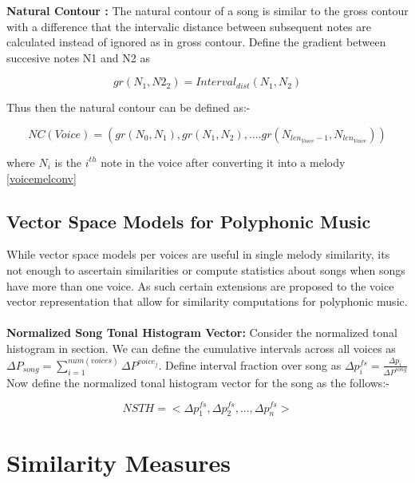 \noindent \textbf{Natural Contour : } The natural contour of a song is similar to the gross contour with a difference that the intervalic distance between subsequent notes are calculated instead of ignored as in gross contour. Define the gradient between succesive notes N1 and N2 as 

\begin{equation}
gr(N_1, N2_2) = Interval_{dist}(N_1, N_2)
\end{equation}

Thus then the natural contour can be defined as:-

\begin{equation}
NC(Voice) = (gr(N_0, N_1), gr(N_1, N_2), .... gr(N_{len_{Voice} - 1}, N_{len_{Voice}}))
\end{equation}

where $N_i$ is the $i^{th}$ note in the voice after converting it into a melody \ref{voicemelconv}



\subsection{Vector Space Models for Polyphonic Music} 

\noindent While vector space models per voices are useful in single melody similarity, its not enough to ascertain similarities or compute statistics about songs when songs have more than one voice. As such certain extensions are proposed to the voice vector representation that allow for similarity computations for polyphonic music.\\\\
\noindent \textbf{Normalized Song Tonal Histogram Vector:}  \noindent Consider the normalized tonal histogram in section. We can define the cumulative intervals across all voices as \\ $\Delta P_{song} = \sum_{i = 1}^{num(voices)} \Delta P^{voice_j}$. Define interval fraction over song as $\Delta p^{fs}_i = \frac{\Delta p_i}{\Delta P^{song}}$   Now define the normalized tonal histogram vector for the song as the follows:-

\begin{equation}
NSTH = <\Delta p^{fs}_1, \Delta p^{fs}_2, ... , \Delta p^{fs}_n>
\end{equation}

\section{Similarity Measures}

